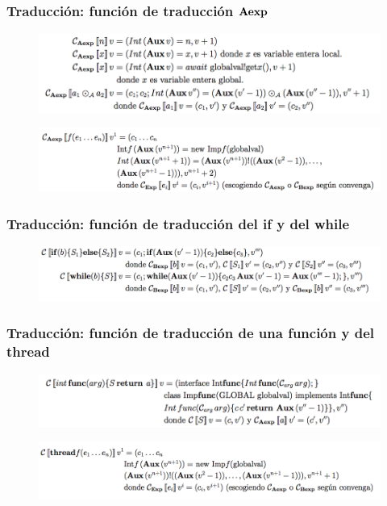 \documentclass[spanish, a4paper, 12pt, final, slideColor, nototal, colorBG, pdf, noaccumulate, darkblue] {beamer}
\begin{document}
\begin{frame}[fragile]
  \frametitle{Traducción: función de traducción $\textbf{Aexp}$}
  \begin{figure}[h]
    \centering
    \includegraphics[scale=0.7]{trada.png}
  \end{figure}
  \begin{figure}[h]
    \centering
    \includegraphics[scale=0.7]{tradf.png}
  \end{figure}
\end{frame}

\begin{frame}[fragile]
  \frametitle{Traducción: función de traducción del if y del while}
  \begin{figure}[h]
    \centering
    \includegraphics[scale=0.7]{tradc.png}
  \end{figure}
\end{frame}

\begin{frame}[fragile]
  \frametitle{Traducción: función de traducción de una función y del thread}
  \begin{figure}[h]
    \centering
    \includegraphics[scale=0.7]{tradfd.png}
  \end{figure}
  \begin{figure}[h]
    \centering
    \includegraphics[scale=0.7]{tradth.png}
  \end{figure}
\end{frame}
\end{document}
